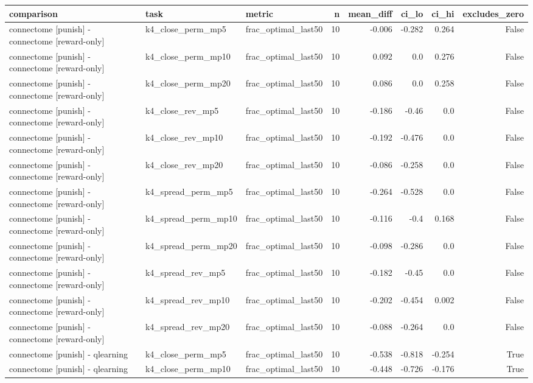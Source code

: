\begin{table}[t]
\centering
\small
\begin{tabular}{lllrrrrr}
\toprule
comparison & task & metric & n & mean\_diff & ci\_lo & ci\_hi & excludes\_zero \\
\midrule
connectome [punish] - connectome [reward-only] & k4\_close\_perm\_mp5 & frac\_optimal\_last50 & 10 & -0.006 & -0.282 & 0.264 & False \\
connectome [punish] - connectome [reward-only] & k4\_close\_perm\_mp10 & frac\_optimal\_last50 & 10 & 0.092 & 0.0 & 0.276 & False \\
connectome [punish] - connectome [reward-only] & k4\_close\_perm\_mp20 & frac\_optimal\_last50 & 10 & 0.086 & 0.0 & 0.258 & False \\
connectome [punish] - connectome [reward-only] & k4\_close\_rev\_mp5 & frac\_optimal\_last50 & 10 & -0.186 & -0.46 & 0.0 & False \\
connectome [punish] - connectome [reward-only] & k4\_close\_rev\_mp10 & frac\_optimal\_last50 & 10 & -0.192 & -0.476 & 0.0 & False \\
connectome [punish] - connectome [reward-only] & k4\_close\_rev\_mp20 & frac\_optimal\_last50 & 10 & -0.086 & -0.258 & 0.0 & False \\
connectome [punish] - connectome [reward-only] & k4\_spread\_perm\_mp5 & frac\_optimal\_last50 & 10 & -0.264 & -0.528 & 0.0 & False \\
connectome [punish] - connectome [reward-only] & k4\_spread\_perm\_mp10 & frac\_optimal\_last50 & 10 & -0.116 & -0.4 & 0.168 & False \\
connectome [punish] - connectome [reward-only] & k4\_spread\_perm\_mp20 & frac\_optimal\_last50 & 10 & -0.098 & -0.286 & 0.0 & False \\
connectome [punish] - connectome [reward-only] & k4\_spread\_rev\_mp5 & frac\_optimal\_last50 & 10 & -0.182 & -0.45 & 0.0 & False \\
connectome [punish] - connectome [reward-only] & k4\_spread\_rev\_mp10 & frac\_optimal\_last50 & 10 & -0.202 & -0.454 & 0.002 & False \\
connectome [punish] - connectome [reward-only] & k4\_spread\_rev\_mp20 & frac\_optimal\_last50 & 10 & -0.088 & -0.264 & 0.0 & False \\
connectome [punish] - qlearning & k4\_close\_perm\_mp5 & frac\_optimal\_last50 & 10 & -0.538 & -0.818 & -0.254 & True \\
connectome [punish] - qlearning & k4\_close\_perm\_mp10 & frac\_optimal\_last50 & 10 & -0.448 & -0.726 & -0.176 & True \\

\end{tabular}
\end{table}
